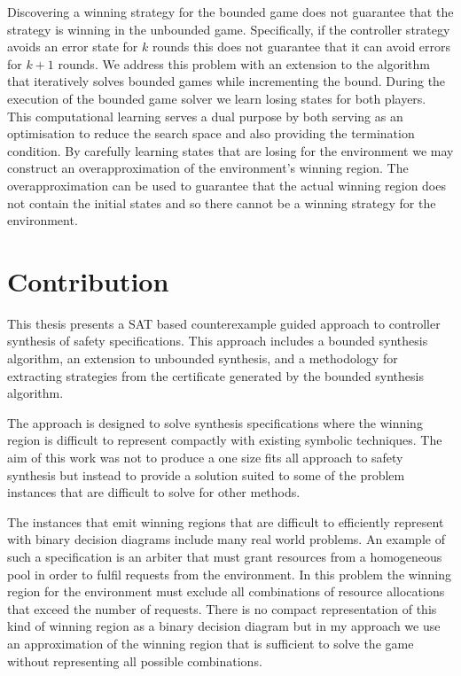 Discovering a winning strategy for the bounded game does not guarantee that the strategy is winning in the unbounded game. Specifically, if the controller strategy avoids an error state for $k$ rounds this does not guarantee that it can avoid errors for $k+1$ rounds. We address this problem with an extension to the algorithm that iteratively solves bounded games while incrementing the bound. During the execution of the bounded game solver we learn losing states for both players. This computational learning serves a dual purpose by both serving as an optimisation to reduce the search space and also providing the termination condition. By carefully learning states that are losing for the environment we may construct an overapproximation of the environment's winning region. The overapproximation can be used to guarantee that the actual winning region does not contain the initial states and so there cannot be a winning strategy for the environment.


\section{Contribution}

This thesis presents a SAT based counterexample guided approach to controller synthesis of safety specifications. This approach includes a bounded synthesis algorithm, an extension to unbounded synthesis, and a methodology for extracting strategies from the certificate generated by the bounded synthesis algorithm. 

The approach is designed to solve synthesis specifications where the winning region is difficult to represent compactly with existing symbolic techniques. The aim of this work was not to produce a one size fits all approach to safety synthesis but instead to provide a solution suited to some of the problem instances that are difficult to solve for other methods.

The instances that emit winning regions that are difficult to efficiently represent with binary decision diagrams include many real world problems. An example of such a specification is an arbiter that must grant resources from a homogeneous pool in order to fulfil requests from the environment. In this problem the winning region for the environment must exclude all combinations of resource allocations that exceed the number of requests. There is no compact representation of this kind of winning region as a binary decision diagram but in my approach we use an approximation of the winning region that is sufficient to solve the game without representing all possible combinations.

